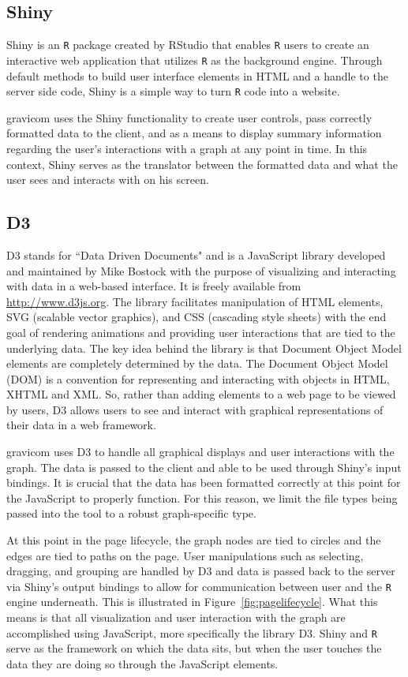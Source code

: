 \documentclass{article}\usepackage[]{graphicx}\usepackage[]{color}
\begin{document}
\subsection{Shiny}

Shiny \cite{rs-shiny} is an {\tt R} package created by RStudio that enables {\tt R} users to create an interactive web application that utilizes {\tt R} as the background engine. Through default methods to build user interface elements in HTML and a handle to the server side code, Shiny is a simple way to turn {\tt R} code into a website. 

gravicom uses the Shiny functionality to create user controls, pass correctly formatted data to the client, and as a means to display summary information regarding the user's interactions with a graph at any point in time. In this context, Shiny serves as the translator between the formatted data and what the user sees and interacts with on his screen.


\subsection{D3}

D3 \cite{mb-d3} stands for ``Data Driven Documents" and is a JavaScript library developed and maintained by Mike Bostock with the  purpose of visualizing and interacting with data in a web-based interface. It is freely available from \url{http://www.d3js.org}. The library facilitates manipulation of HTML elements, SVG (scalable vector graphics), and CSS (cascading style sheets) with the end goal of rendering animations and providing user interactions that are tied to the underlying data. The key idea behind the library is that Document Object Model elements are completely determined by the data. The Document Object Model (DOM) is a convention for representing and interacting with objects in HTML, XHTML and XML. So, rather than adding elements to a web page to be viewed by users, D3 allows users to see and interact with graphical representations of their data in a web framework. 

gravicom uses D3 to handle all graphical displays and user interactions with the graph. The data is passed to the client and able to be used through Shiny's input bindings. It is crucial that the data has been formatted correctly at this point for the JavaScript to properly function. For this reason, we limit the file types being passed into the tool to a robust graph-specific type.

At this point in the page lifecycle, the graph nodes are tied to circles and the edges are tied to paths on the page. User manipulations such as selecting, dragging, and grouping are handled by D3 and  data is passed back to the server via Shiny's output bindings to allow for communication between user and the {\tt R} engine underneath. This is illustrated in Figure~\ref{fig:pagelifecycle}. What this means is that all visualization and user interaction with the graph are accomplished using JavaScript, more specifically the library D3. Shiny and {\tt R} serve as the framework on which the data sits, but when the user touches the data they are doing so through the JavaScript elements. 
\end{document}
